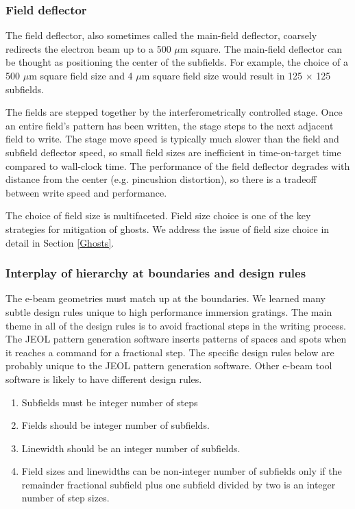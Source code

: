 \documentclass[]{spie}  %
\begin{document}
\subsubsection{Field deflector}
\label{sec:Field}
The field deflector, also sometimes called the main-field deflector, coarsely redirects the electron beam up to a 500 $\mu$m square.  The main-field deflector can be thought as positioning the center of the subfields.  For example, the choice of a 500 $\mu$m square field size and 4 $\mu$m square field size would result in 125 $\times$ 125 subfields.

The fields are stepped together by the interferometrically controlled stage.  Once an entire field's pattern has been written, the stage steps to the next adjacent field to write.  The stage move speed is typically much slower than the field and subfield deflector speed, so small field sizes are inefficient in time-on-target time compared to wall-clock time.  The performance of the field deflector degrades with distance from the center (e.g. pincushion distortion), so there is a tradeoff between write speed and performance.  

The choice of field size is multifaceted.  Field size choice is one of the key strategies for mitigation of ghosts.  We address the issue of field size choice in detail in Section \ref{Ghosts}.  

\subsubsection{Interplay of hierarchy at boundaries and design rules}
\label{sec:Boundaries}
The e-beam geometries must match up at the boundaries.  We learned many subtle design rules unique to high performance immersion gratings.  The main theme in all of the design rules is to avoid fractional steps in the writing process.  The JEOL pattern generation software inserts patterns of spaces and spots when it reaches a command for a fractional step.  The specific design rules below are probably unique to the JEOL pattern generation software.  Other e-beam tool software is likely to have different design rules.
\begin{enumerate}
  \item Subfields must be integer number of steps
  \item Fields should be integer number of subfields.  
  \item Linewidth should be an integer number of subfields.
  \item Field sizes and linewidths can be non-integer number of subfields only if the remainder fractional subfield plus one subfield divided by two is an integer number of step sizes.
\end{enumerate}   
\end{document}
